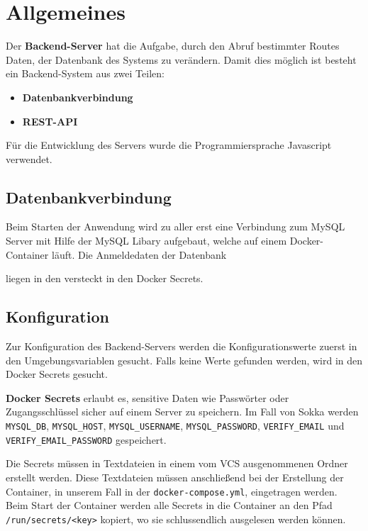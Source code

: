 \chapter{Allgemeines}

Der \textbf{Backend-Server} hat die Aufgabe, durch den Abruf bestimmter Routes Daten, der Datenbank des Systems zu verändern. Damit dies möglich ist besteht ein Backend-System aus zwei Teilen:

\begin{itemize}
    \item \textbf{Datenbankverbindung}
    \item \textbf{REST-API}
\end{itemize}

Für die Entwicklung des Servers wurde die Programmiersprache Javascript verwendet.

\section{Datenbankverbindung}

Beim Starten der Anwendung wird zu aller erst eine Verbindung zum MySQL Server mit Hilfe der MySQL Libary aufgebaut, welche auf einem Docker-Container läuft. Die Anmeldedaten der Datenbank

liegen in den versteckt in den Docker Secrets.



\section{Konfiguration}

Zur Konfiguration des Backend-Servers werden die Konfigurationswerte zuerst in den Umgebungsvariablen gesucht. Falls keine Werte gefunden werden, wird in den Docker Secrets gesucht.

\label{dockersecrets}

\textbf{Docker Secrets} erlaubt es, sensitive Daten wie Passwörter oder Zugangsschlüssel sicher auf einem Server zu speichern. Im Fall von Sokka werden \lstinline{MYSQL_DB}, \lstinline{MYSQL_HOST}, \lstinline{MYSQL_USERNAME}, \lstinline{MYSQL_PASSWORD}, \lstinline{VERIFY_EMAIL} und \lstinline{VERIFY_EMAIL_PASSWORD} gespeichert.

Die Secrets müssen in Textdateien in einem vom VCS ausgenommenen Ordner erstellt werden. Diese Textdateien müssen anschließend bei der Erstellung der Container, in unserem Fall in der \lstinline{docker-compose.yml}, eingetragen werden. Beim Start der Container werden alle Secrets in die Container an den Pfad \lstinline{/run/secrets/<key>} kopiert, wo sie schlussendlich ausgelesen werden können.

